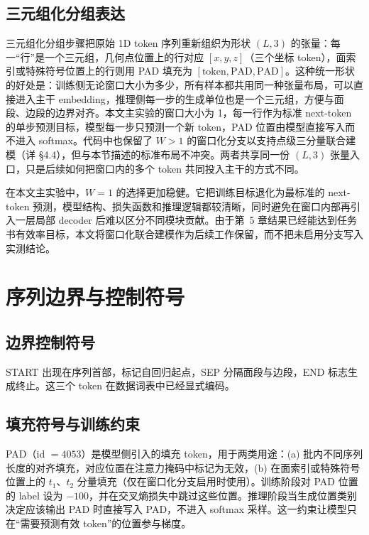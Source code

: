 \subsection{三元组化分组表达}

三元组化分组步骤把原始 1D token 序列重新组织为形状 $(L, 3)$ 的张量：每一“行”是一个三元组，几何点位置上的行对应 $[x, y, z]$（三个坐标 token），面索引或特殊符号位置上的行则用 PAD 填充为 $[\text{token}, \text{PAD}, \text{PAD}]$。这种统一形状的好处是：训练侧无论窗口大小为多少，所有样本都共用同一种张量布局，可以直接进入主干 embedding，推理侧每一步的生成单位也是一个三元组，方便与面段、边段的边界对齐。本文主实验的窗口大小为 1，每一行作为标准 next-token 的单步预测目标，模型每一步只预测一个新 token，PAD 位置由模型直接写入而不进入 softmax。代码中也保留了 $W > 1$ 的窗口化分支以支持点级三分量联合建模（详 §4.4），但与本节描述的标准布局不冲突。两者共享同一份 $(L, 3)$ 张量入口，只是后续如何把窗口内的多个 token 共同投入主干的方式不同。

在本文主实验中，$W = 1$ 的选择更加稳健。它把训练目标退化为最标准的 next-token 预测，模型结构、损失函数和推理逻辑都较清晰，同时避免在窗口内部再引入一层局部 decoder 后难以区分不同模块贡献。由于第~5 章结果已经能达到任务书有效率目标，本文将窗口化联合建模作为后续工作保留，而不把未启用分支写入实测结论。

\section{序列边界与控制符号}

\subsection{边界控制符号}

START 出现在序列首部，标记自回归起点，SEP 分隔面段与边段，END 标志生成终止。这三个 token 在数据词表中已经显式编码。

\subsection{填充符号与训练约束}

PAD（id $= 4053$）是模型侧引入的填充 token，用于两类用途：(a) 批内不同序列长度的对齐填充，对应位置在注意力掩码中标记为无效，(b) 在面索引或特殊符号位置上的 $t_1$、$t_2$ 分量填充（仅在窗口化分支启用时使用）。训练阶段对 PAD 位置的 label 设为 $-100$，并在交叉熵损失中跳过这些位置。推理阶段当生成位置类别决定应该输出 PAD 时直接写入 PAD，不进入 softmax 采样。这一约束让模型只在“需要预测有效 token”的位置参与梯度。

